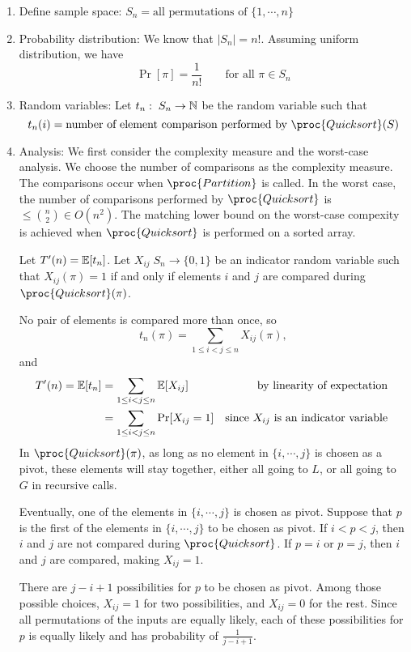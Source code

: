 \begin{enumerate}
    \item Define sample space: $S_n = \text{all permutations of $\{1,\cdots,n\}$}$
    \item Probability distribution: We know that $\left| S_n \right| = n!$. Assuming uniform distribution, we have
    $$
    \Pr[\pi] = \frac{1}{n!} \qquad \text{for all $\pi \in S_n$}
    $$
    \item Random variables: Let $t_n: \; S_n \to \mathbb{N}$ be the random variable such that
    $$
    t_n(i) = \text{number of element comparison performed by $\proc{Quicksort}(S)$}
    $$
    \item Analysis: We first consider the complexity measure and the worst-case analysis. We choose the number of comparisons as the complexity measure. The comparisons occur when $\proc{Partition}$ is called. In the worst case, the number of comparisons performed by $\proc{Quicksort}$ is $\leq {n \choose 2} \in O(n^2)$. The matching lower bound on the worst-case compexity is achieved when $\proc{Quicksort}$ is performed on a sorted array.
    
    Let $T'(n) = \operatorname*{\mathbb{E}}[t_n]$. Let $X_{ij} \; S_n \to \{0,1\}$ be an indicator random variable such that $X_{ij}(\pi) = 1$ if and only if elements $i$ and $j$ are compared during $\proc{Quicksort}(\pi)$. 
    
    No pair of elements is compared more than once, so
    $$
    t_n(\pi) = \sum_{1 \leq i < j \leq n} X_{ij}(\pi),
    $$
    and
    $$
    \begin{aligned}
        T'(n) = \operatorname*{\mathbb{E}}[t_n] &= \sum_{1 \leq i < j \leq n} \operatorname*{\mathbb{E}}[X_{ij}] & {\text{by linearity of expectation }} \\
        &= \sum_{1 \leq i < j \leq n} \Pr[X_{ij} = 1] & {\text{since $X_{ij}$ is an indicator variable }}
    \end{aligned}
    $$
    In $\proc{Quicksort}(\pi)$, as long as no element in $\{i, \cdots, j\}$ is chosen as a pivot, these elements will stay together, either all going to $L$, or all going to $G$ in recursive calls. 

    Eventually, one of the elements in $\{i, \cdots, j\}$ is chosen as pivot. Suppose that $p$ is the first of the elements in $\{ i, \cdots, j \}$ to be chosen as pivot. If $i < p < j$, then $i$ and $j$ are not compared during $\proc{Quicksort}$. If $p=i$ or $p=j$, then $i$ and $j$ are compared, making $X_{ij}=1$.
    
    There are $j-i+1$ possibilities for $p$ to be chosen as pivot. Among those possible choices, $X_{ij} = 1$ for two possibilities, and $X_{ij} = 0$ for the rest. Since all permutations of the inputs are equally likely, each of these possibilities for $p$ is equally likely and has probability of $\displaystyle \frac{1}{j-i+1}$.


\end{enumerate}
